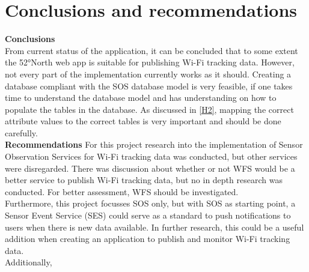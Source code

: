 \chapter{Conclusions and recommendations}
\textbf{Conclusions}\\
From current status of the application, it can be concluded that to some extent the 52°North web app is suitable for publishing Wi-Fi tracking data. However, not every part of the implementation currently works as it should. Creating a database compliant with the SOS database model is very feasible, if one takes time to understand the database model and has understanding on how to populate the tables in the database. As discussed in \autoref{H2}, mapping the correct attribute values to the correct tables is very important and should be done carefully. \\

\textbf{Recommendations}
For this project research into the implementation of Sensor Observation Services for Wi-Fi tracking data was conducted, but other services were disregarded. There was discussion about whether or not WFS would be a better service to publish Wi-Fi tracking data, but no in depth research was conducted. For better assessment, WFS should be investigated.\\
Furthermore, this project focusses SOS only, but with SOS as starting point, a Sensor Event Service (SES) could serve as a standard to push notifications to users when there is new data available. In further research, this could be a useful addition when creating an application to publish and monitor Wi-Fi tracking data. \\
Additionally,  

